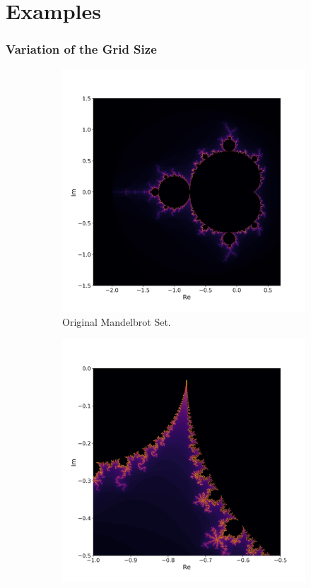 \documentclass[
  12pt,					%
  a4paper,				%
  twoside,				%
]{report}
\begin{document}
\section{Examples}

\subsubsection{Variation of the Grid Size}

\begin{figure}[H]
\centering
\begin{subfigure}{.45\textwidth}
  \centering
  \includegraphics[width=\linewidth]{IMG/GridSize1.png}
  \caption{Original Mandelbrot Set.}
\end{subfigure}%
\begin{subfigure}{.45\textwidth}
  \centering
  \includegraphics[width=\linewidth]{IMG/GridSize2.png}

\end{subfigure}
\end{figure}
\end{document}

